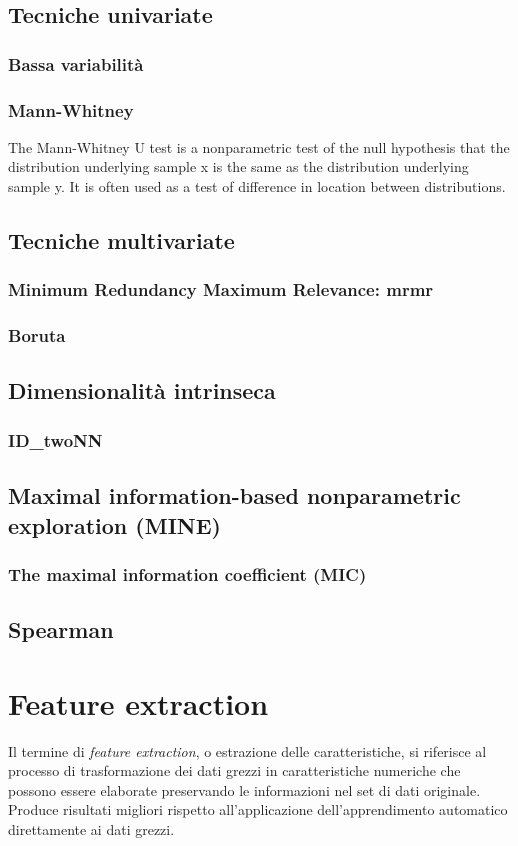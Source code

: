\documentclass[12pt,italian]{report}
\begin{document}
	\subsection{Tecniche univariate}
	\subsubsection{Bassa variabilità}
	\subsubsection{Mann-Whitney}
	The Mann-Whitney U test is a nonparametric test of the null hypothesis that the distribution underlying sample x is the same as the distribution underlying sample y. It is often used as a test of difference in location between distributions.
	\subsection{Tecniche multivariate}
	\subsubsection{Minimum Redundancy Maximum Relevance: mrmr}
	\subsubsection{Boruta}
	\subsection{Dimensionalità intrinseca}
	\subsubsection{ID\_twoNN}
	\subsection{Maximal information-based nonparametric exploration (MINE)}
	\subsubsection{The maximal information coefficient (MIC)}
	\subsection{Spearman}
	
	\section{Feature extraction}
	Il termine di \textit{feature extraction}, o estrazione delle caratteristiche, si riferisce al processo di trasformazione dei dati grezzi in caratteristiche numeriche che possono essere elaborate preservando le informazioni nel set di dati originale. Produce risultati migliori rispetto all'applicazione dell'apprendimento automatico direttamente ai dati grezzi.
\end{document}
